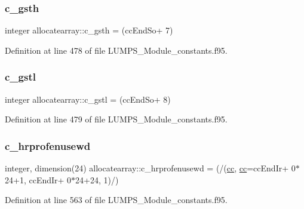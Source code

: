 \subsubsection{\texorpdfstring{c\+\_\+gsth}{c\_gsth}}
{\footnotesize\ttfamily integer allocatearray\+::c\+\_\+gsth = (cc\+End\+So+ 7)}



Definition at line 478 of file L\+U\+M\+P\+S\+\_\+\+Module\+\_\+constants.\+f95.

\mbox{\label{namespaceallocatearray_aa11ae08cca1b320e3e176e06ac0daa50}} 
\subsubsection{\texorpdfstring{c\+\_\+gstl}{c\_gstl}}
{\footnotesize\ttfamily integer allocatearray\+::c\+\_\+gstl = (cc\+End\+So+ 8)}



Definition at line 479 of file L\+U\+M\+P\+S\+\_\+\+Module\+\_\+constants.\+f95.

\mbox{\label{namespaceallocatearray_af7360c52bc2192621d817bdbc4d60a9c}} 
\subsubsection{\texorpdfstring{c\+\_\+hrprofenusewd}{c\_hrprofenusewd}}
{\footnotesize\ttfamily integer, dimension(24) allocatearray\+::c\+\_\+hrprofenusewd = (/(\hyperlink{namespaceallocatearray_ac863c81704eb507dee10f5e10741e10c}{cc}, \hyperlink{namespaceallocatearray_ac863c81704eb507dee10f5e10741e10c}{cc}=cc\+End\+Ir+ 0$\ast$24+1, cc\+End\+Ir+ 0$\ast$24+24, 1)/)}



Definition at line 563 of file L\+U\+M\+P\+S\+\_\+\+Module\+\_\+constants.\+f95.

\mbox{\label{namespaceallocatearray_a318c5a0cfc33bb9e3dcfa2eb8f18efec}} 
